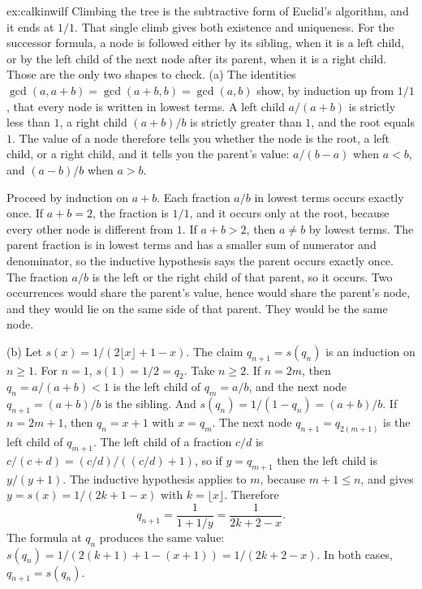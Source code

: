 \begin{solution}{ex:calkinwilf}
\idea Climbing the tree is the subtractive form of Euclid's algorithm, and it ends at $1/1$. That single climb gives both existence and uniqueness. For the successor formula, a node is followed either by its sibling, when it is a left child, or by the left child of the next node after its parent, when it is a right child. Those are the only two shapes to check.
\writeup (a) The identities $\gcd(a,a+b)=\gcd(a+b,b)=\gcd(a,b)$ show, by induction up from $1/1$, that every node is written in lowest terms. A left child $a/(a+b)$ is strictly less than $1$, a right child $(a+b)/b$ is strictly greater than $1$, and the root equals $1$. The value of a node therefore tells you whether the node is the root, a left child, or a right child, and it tells you the parent's value: $a/(b-a)$ when $a<b$, and $(a-b)/b$ when $a>b$.

Proceed by induction on $a+b$. Each fraction $a/b$ in lowest terms occurs exactly once. If $a+b=2$, the fraction is $1/1$, and it occurs only at the root, because every other node is different from $1$. If $a+b>2$, then $a\ne b$ by lowest terms. The parent fraction is in lowest terms and has a smaller sum of numerator and denominator, so the inductive hypothesis says the parent occurs exactly once. The fraction $a/b$ is the left or the right child of that parent, so it occurs. Two occurrences would share the parent's value, hence would share the parent's node, and they would lie on the same side of that parent. They would be the same node.

(b) Let $s(x)=1/(2\lfloor x\rfloor+1-x)$. The claim $q_{n+1}=s(q_n)$ is an induction on $n\ge 1$. For $n=1$, $s(1)=1/2=q_2$. Take $n\ge 2$. If $n=2m$, then $q_n=a/(a+b)<1$ is the left child of $q_m=a/b$, and the next node $q_{n+1}=(a+b)/b$ is the sibling. And $s(q_n)=1/(1-q_n)=(a+b)/b$. If $n=2m+1$, then $q_n=x+1$ with $x=q_m$. The next node $q_{n+1}=q_{2(m+1)}$ is the left child of $q_{m+1}$. The left child of a fraction $c/d$ is $c/(c+d)=(c/d)/((c/d)+1)$, so if $y=q_{m+1}$ then the left child is $y/(y+1)$. The inductive hypothesis applies to $m$, because $m+1\le n$, and gives $y=s(x)=1/(2k+1-x)$ with $k=\lfloor x\rfloor$. Therefore
\[
q_{n+1}=\frac{1}{1+1/y}=\frac{1}{2k+2-x}.
\]
The formula at $q_n$ produces the same value: $s(q_n)=1/(2(k+1)+1-(x+1))=1/(2k+2-x)$. In both cases, $q_{n+1}=s(q_n)$.
\end{solution}

